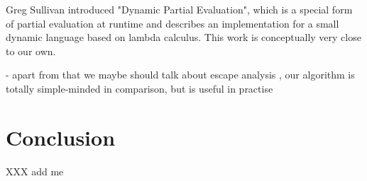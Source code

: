 Greg Sullivan introduced "Dynamic Partial Evaluation", which is a special
form of partial evaluation at runtime \cite{sullivan_dynamic_2001} and describes
an implementation for a small dynamic language based on lambda calculus. This
work is conceptually very close to our own.

 - apart from that we maybe should talk about escape analysis
 \cite{Blanchet99escapeanalysis}, \cite{Choi99escapeanalysis}
 our algorithm is totally simple-minded in comparison, but is useful in practise

\section{Conclusion}

XXX add me

